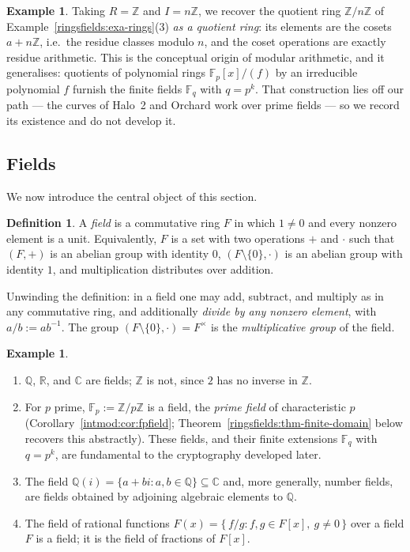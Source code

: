 \documentclass[11pt,a4paper]{article}
\theoremstyle{definition}
\newtheorem{definition}[theorem]{Definition}
\newtheorem{example}[theorem]{Example}
\theoremstyle{remark}
\newcommand{\Z}{\ensuremath{\mathbb{Z}}}
\newcommand{\Q}{\ensuremath{\mathbb{Q}}}
\newcommand{\R}{\ensuremath{\mathbb{R}}}
\providecommand{\C}{}\renewcommand{\C}{\ensuremath{\mathbb{C}}}
\newcommand{\Fp}{\ensuremath{\mathbb{F}_{p}}}
\newcommand{\Fq}{\ensuremath{\mathbb{F}_{q}}}
\begin{document}
\begin{example}\label{ringsfields:exa-quotient-Zn}
Taking \(R=\Z\) and \(I = n\Z\), we recover the quotient ring \(\Z/n\Z\) of Example~\ref{ringsfields:exa-rings}(3) \emph{as a quotient ring}: its elements are the cosets \(a + n\Z\), i.e.\ the residue classes modulo \(n\), and the coset operations are exactly residue arithmetic. This is the conceptual origin of modular arithmetic, and it generalises: quotients of polynomial rings \(\Fp[x]/(f)\) by an irreducible polynomial \(f\) furnish the finite fields \(\Fq\) with \(q = p^k\). That construction lies off our path --- the curves of Halo~2 and Orchard work over prime fields --- so we record its existence and do not develop it.
\end{example}
\subsection{Fields}\label{ringsfields:subsec-fields}

We now introduce the central object of this section.

\begin{definition}\label{ringsfields:def-field}
A \emph{field} is a commutative ring \(F\) in which \(1\neq 0\) and every nonzero element is a unit. Equivalently, \(F\) is a set with two operations \(+\) and \(\cdot\) such that \((F,+)\) is an abelian group with identity \(0\), \((F\setminus\{0\},\cdot)\) is an abelian group with identity \(1\), and multiplication distributes over addition.
\end{definition}

Unwinding the definition: in a field one may add, subtract, and multiply as in any commutative ring, and additionally \emph{divide by any nonzero element}, with \(a/b := ab^{-1}\). The group \((F\setminus\{0\},\cdot) = F^{\times}\) is the \emph{multiplicative group} of the field.

\begin{example}\label{ringsfields:exa-fields}
\begin{enumerate}
\item \(\Q\), \(\R\), and \(\C\) are fields; \(\Z\) is not, since \(2\) has no inverse in \(\Z\).
\item For \(p\) prime, \(\Fp := \Z/p\Z\) is a field, the \emph{prime field} of characteristic \(p\) (Corollary~\ref{intmod:cor:fpfield}; Theorem~\ref{ringsfields:thm-finite-domain} below recovers this abstractly). These fields, and their finite extensions \(\Fq\) with \(q=p^k\), are fundamental to the cryptography developed later.
\item The field \(\Q(i) = \{a+bi : a,b\in\Q\}\subseteq\C\) and, more generally, number fields, are fields obtained by adjoining algebraic elements to \(\Q\).
\item The field of rational functions \(F(x) = \{\,f/g : f,g\in F[x],\ g\neq 0\,\}\) over a field \(F\) is a field; it is the field of fractions of \(F[x]\).
\end{enumerate}
\end{example}
\end{document}
